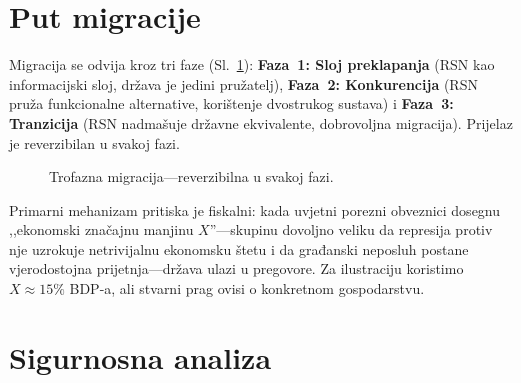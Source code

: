 \documentclass[11pt,a4paper,twocolumn]{article}
\begin{document}
\section{Put migracije}

Migracija se odvija kroz tri faze (Sl.~\ref{fig:migration}): \textbf{Faza~1: Sloj preklapanja} (RSN kao informacijski sloj, država je jedini pružatelj), \textbf{Faza~2: Konkurencija} (RSN pruža funkcionalne alternative, korištenje dvostrukog sustava) i \textbf{Faza~3: Tranzicija} (RSN nadmašuje državne ekvivalente, dobrovoljna migracija). Prijelaz je reverzibilan u svakoj fazi.

\begin{figure}[ht]
\centering
{}
\caption{Trofazna migracija---reverzibilna u svakoj fazi.}
\label{fig:migration}
\end{figure}

Primarni mehanizam pritiska je fiskalni: kada uvjetni porezni obveznici dosegnu ,,ekonomski značajnu manjinu $X$''---skupinu dovoljno veliku da represija protiv nje uzrokuje netrivijalnu ekonomsku štetu i da građanski neposluh postane vjerodostojna prijetnja---država ulazi u pregovore. Za ilustraciju koristimo $X \approx 15\%$ BDP-a, ali stvarni prag ovisi o konkretnom gospodarstvu.

\section{Sigurnosna analiza}
\end{document}
